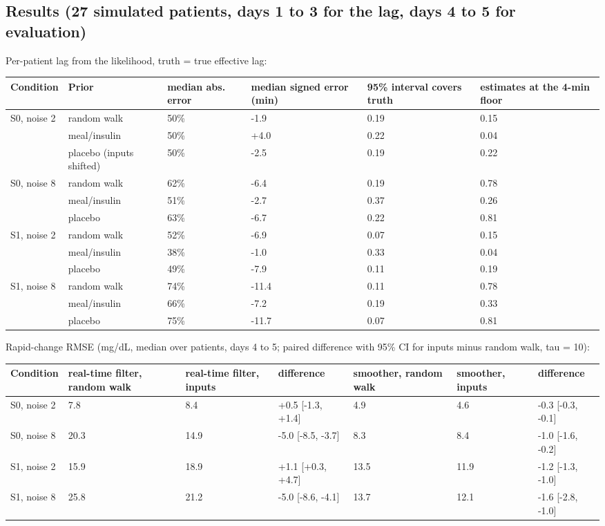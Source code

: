 \documentclass[11pt,a4paper]{article}
\begin{document}
\hypertarget{results-27-simulated-patients-days-1-to-3-for-the-lag-days-4-to-5-for-evaluation}{%
\subsection{Results (27 simulated patients, days 1 to 3 for the lag,
days 4 to 5 for
evaluation)}\label{results-27-simulated-patients-days-1-to-3-for-the-lag-days-4-to-5-for-evaluation}}

Per-patient lag from the likelihood, truth = true effective lag:

\begin{longtable}[]{@{}llllll@{}}
\toprule\noalign{}
Condition & Prior & median abs. error & median signed error (min) & 95\%
interval covers truth & estimates at the 4-min floor \\
\midrule\noalign{}
\endhead
\bottomrule\noalign{}
\endlastfoot
S0, noise 2 & random walk & 50\% & -1.9 & 0.19 & 0.15 \\
& meal/insulin & 50\% & +4.0 & 0.22 & 0.04 \\
& placebo (inputs shifted) & 50\% & -2.5 & 0.19 & 0.22 \\
S0, noise 8 & random walk & 62\% & -6.4 & 0.19 & 0.78 \\
& meal/insulin & 51\% & -2.7 & 0.37 & 0.26 \\
& placebo & 63\% & -6.7 & 0.22 & 0.81 \\
S1, noise 2 & random walk & 52\% & -6.9 & 0.07 & 0.15 \\
& meal/insulin & 38\% & -1.0 & 0.33 & 0.04 \\
& placebo & 49\% & -7.9 & 0.11 & 0.19 \\
S1, noise 8 & random walk & 74\% & -11.4 & 0.11 & 0.78 \\
& meal/insulin & 66\% & -7.2 & 0.19 & 0.33 \\
& placebo & 75\% & -11.7 & 0.07 & 0.81 \\
\end{longtable}

Rapid-change RMSE (mg/dL, median over patients, days 4 to 5; paired
difference with 95\% CI for inputs minus random walk, tau = 10):

\begin{longtable}[]{@{}lllllll@{}}
\toprule\noalign{}
Condition & real-time filter, random walk & real-time filter, inputs &
difference & smoother, random walk & smoother, inputs & difference \\
\midrule\noalign{}
\endhead
\bottomrule\noalign{}
\endlastfoot
S0, noise 2 & 7.8 & 8.4 & +0.5 {[}-1.3, +1.4{]} & 4.9 & 4.6 & -0.3
{[}-0.3, -0.1{]} \\
S0, noise 8 & 20.3 & 14.9 & -5.0 {[}-8.5, -3.7{]} & 8.3 & 8.4 & -1.0
{[}-1.6, -0.2{]} \\
S1, noise 2 & 15.9 & 18.9 & +1.1 {[}+0.3, +4.7{]} & 13.5 & 11.9 & -1.2
{[}-1.3, -1.0{]} \\
S1, noise 8 & 25.8 & 21.2 & -5.0 {[}-8.6, -4.1{]} & 13.7 & 12.1 & -1.6
{[}-2.8, -1.0{]} \\
\end{longtable}
\end{document}
